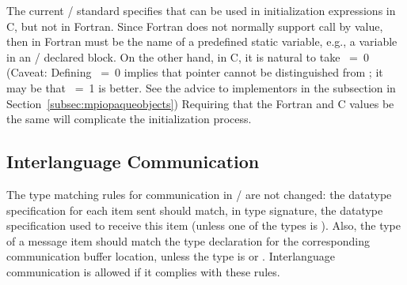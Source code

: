 \begin{rationale}
The current \MPI/ standard specifies that  can be
used in initialization expressions in C, but not in Fortran.  Since
Fortran does not normally support call by value, then
 in Fortran must be the name of a predefined
static variable, e.g., a variable in an \MPI/ declared 
block. On the other hand, in C, it is natural to take
\ =\ 0 (Caveat: Defining \ =\ 0
implies that  pointer cannot be distinguished from
; it may be that \ =\ 1 is better.
See the advice to implementors in the  subsection in
Section~\ref{subsec:mpiopaqueobjects})
Requiring that the Fortran and C values be the same will complicate
the initialization process.
\end{rationale}

\subsection{Interlanguage Communication}
\label{subsec:interlanguage-communication}
The type matching rules for communication in \MPI/ are not changed:
the datatype specification for each item sent should match,
in type signature, the datatype specification used to receive this item
(unless one of the types is ).
Also, the
type of a message item should match the type declaration for the
corresponding communication buffer location, unless the type is
 or .  Interlanguage
communication is allowed if it complies with these rules.

